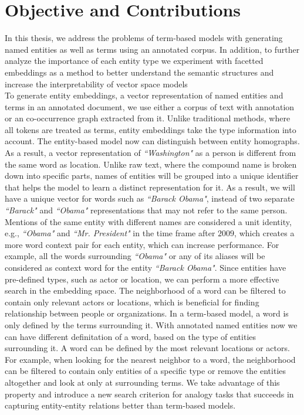 \section{Objective and Contributions}
In this thesis, we address the problems of term-based models with generating named entities as well as terms using an annotated corpus. In addition, to further analyze the importance of each entity type we experiment with facetted embeddings as a method to better understand the semantic structures and increase the interpretability of vector space models\\
To generate entity embeddings, a vector representation of named entities and terms in an annotated document, we use either a corpus of text with annotation or an co-occurrence graph extracted from it. Unlike traditional methods, where all tokens are treated as terms, entity embeddings take the type information into account. The entity-based model now can distinguish between entity homographs. As a result, a vector representation of \emph{``Washington"} as a person is different from the same word as location. Unlike raw text, where the compound name is broken down into specific parts, names of entities will be grouped into a unique identifier that helps the model to learn a distinct representation for it. As a result, we will have a unique vector for words such as  \emph{``Barack Obama"}, instead of two separate \emph{``Barack"} and \emph{``Obama"} representations that may not refer to the same person. Mentions of the same entity with different names are considered a unit identity, e.g., \emph{``Obama"} and \emph{``Mr. President"} in the time frame after $2009$, which creates a more word context pair for each entity, which can increase performance. For example, all the words surrounding \emph{``Obama"} or any of its aliases will be considered as context word for the entity \emph{``Barack Obama"}. Since entities have pre-defined types, such as actor or location, we can perform a more effective search in the embedding space. The neighborhood of a word can be filtered to contain only relevant actors or locations, which is beneficial for finding relationship between people or organizations. In a term-based model, a word is only defined by the terms surrounding it. With annotated named entities now we can have different definitation of a word, based on the type of entities surrounding it. A word can be defined by the most relevant locations or actors. For example, when looking for the nearest neighbor to a word, the neighborhood can be filtered to contain only entities of a specific type or remove the entities altogether and look at only at surrounding terms. We take advantage of this property and introduce a new search criterion for analogy tasks that succeeds in capturing entity-entity relations better than term-based models. \\

